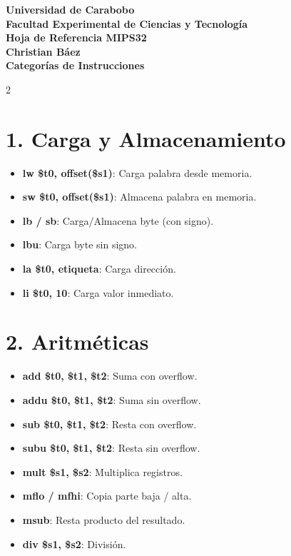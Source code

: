 \documentclass[10pt,portrait]{article}
\begin{document}
\pagestyle{empty}

\begin{center}
    {\large \textbf{Universidad de Carabobo}} \\
    {\large \textbf{Facultad Experimental de Ciencias y Tecnología}} \\[0.5em]
    {\huge \textbf{Hoja de Referencia MIPS32}} \\[0.3em]
    {\large \textbf{Christian Báez}} \\[0.3em]
    {\large \textbf{\color{ucblue}Categorías de Instrucciones}} \\[0.5em]
\end{center}

\vspace{0.4cm}

\begin{multicols}{2}

\section*{1. Carga y Almacenamiento}
\begin{itemize}
    \item \textbf{lw \$t0, offset(\$s1)}: Carga palabra desde memoria.
    \item \textbf{sw \$t0, offset(\$s1)}: Almacena palabra en memoria.
    \item \textbf{lb / sb}: Carga/Almacena byte (con signo).
    \item \textbf{lbu}: Carga byte sin signo.
    \item \textbf{la \$t0, etiqueta}: Carga dirección.
    \item \textbf{li \$t0, 10}: Carga valor inmediato.
\end{itemize}

\section*{2. Aritméticas}
\begin{itemize}
    \item \textbf{add \$t0, \$t1, \$t2}: Suma con overflow.
    \item \textbf{addu \$t0, \$t1, \$t2}: Suma sin overflow.
    \item \textbf{sub \$t0, \$t1, \$t2}: Resta con overflow.
    \item \textbf{subu \$t0, \$t1, \$t2}: Resta sin overflow.
    \item \textbf{mult \$s1, \$s2}: Multiplica registros.
    \item \textbf{mflo / mfhi}: Copia parte baja / alta.
    \item \textbf{msub}: Resta producto del resultado.
    \item \textbf{div \$s1, \$s2}: División.
\end{itemize}


\end{multicols}
\end{document}
